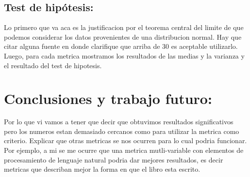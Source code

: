 \documentclass[12pt,journal,compsoc]{IEEEtran}
\begin{document}
\subsection{Test de hipótesis:} Lo primero que va aca es la justificacion por el teorema central del limite de que podemos considerar los datos provenientes de una distribucion normal. Hay que citar alguna fuente en donde clarifique que arriba de 30 es aceptable utilizarlo. Luego, para cada metrica mostramos los resultados de las medias y la varianza y el resultado del test de hipotesis.

\section{Conclusiones y trabajo futuro:} Por lo que vi vamos a tener que decir que obtuvimos resultados significativos pero los numeros estan demasiado cercanos como para utilizar la metrica como criterio. Explicar que otras metricas se nos ocurren para lo cual podria funcionar. Por ejemplo, a mi se me ocurre que una metrica mutli-variable con elementos de procesamiento de lenguaje natural podria dar mejores resultados, es decir metricas que describan mejor la forma en que el libro esta escrito.\\


%
\end{document}
